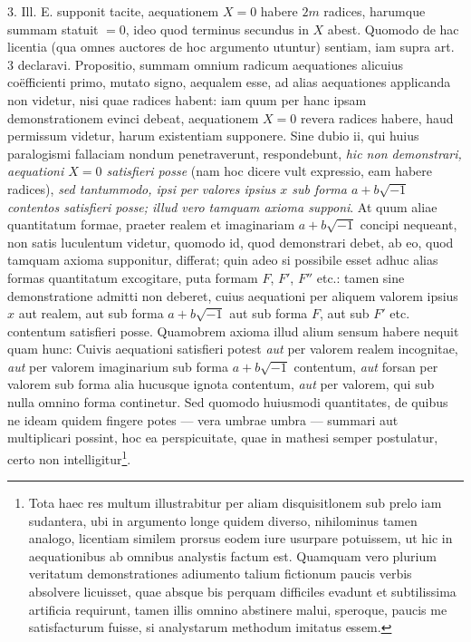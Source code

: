 \documentclass[twoside,12pt, showframe]{memoir}
\begin{document}
3. Ill. \textsc{E.} supponit tacite, aequationem \(X=0\) habere \(2m\) radices, harumque summam statuit \(= 0\), ideo quod terminus secundus in \(X\) abest. Quomodo de hac licentia (qua omnes auctores de hoc argumento utuntur) sentiam, iam supra art. 3 declaravi. Propositio, summam omnium radicum aequationes alicuius co\"efficienti primo, mutato signo, aequalem esse, ad alias aequationes applicanda non videtur, nisi quae radices habent: iam quum per hanc ipsam demonstrationem evinci debeat, aequationem \(X = 0\) revera radices habere, haud permissum videtur, harum existentiam supponere. Sine dubio ii, qui huius paralogismi fallaciam nondum penetraverunt, respondebunt, \textit{hic non demonstrari, aequationi \(X= 0\) satisfieri posse} (nam hoc dicere vult expressio, eam habere radices), \textit{sed tantummodo, ipsi per valores ipsius \(x\) sub forma \(a + b \surd{-1}\) contentos satisfieri posse; illud vero tamquam axioma supponi}. At quum aliae quantitatum formae, praeter realem et imaginariam \(a + b \surd{-1}\) concipi nequeant, non satis luculentum videtur, quomodo id, quod demonstrari debet, ab eo, quod tamquam axioma supponitur, differat; quin adeo si possibile esset adhuc alias formas quantitatum excogitare, puta formam \(F\), \(F'\), \(F''\) etc{.}: tamen sine demonstratione admitti non deberet, cuius aequationi per aliquem valorem ipsius \(x\) aut realem, aut sub forma \(a + b \surd{-1}\) aut sub forma \(F\), aut sub \(F'\) etc{.} contentum satisfieri posse. Quamobrem axioma illud alium sensum habere nequit quam hunc: Cuivis aequationi satisfieri potest \textit{aut} per valorem realem incognitae, \textit{aut} per valorem imaginarium sub forma \(a + b \surd{-1}\) contentum, \textit{aut} forsan per valorem sub forma alia hucusque ignota contentum, \textit{aut} per valorem, qui sub nulla omnino forma continetur. Sed quomodo huiusmodi quantitates, de quibus ne ideam quidem fingere potes — vera umbrae umbra — summari aut multiplicari possint, hoc ea perspicuitate, quae in mathesi semper postulatur, certo non intelligitur\footnote{Tota haec res multum illustrabitur per aliam disquisitlonem sub prelo iam sudantera, ubi in argumento longe quidem diverso, nihilominus tamen analogo, licentiam similem prorsus eodem iure usurpare potuissem, ut hic in aequationibus ab omnibus analystis factum est. Quamquam vero plurium veritatum demonstrationes adiumento talium fictionum paucis verbis absolvere licuisset, quae absque bis perquam difficiles evadunt et subtilissima artificia requirunt, tamen illis omnino abstinere malui, speroque, paucis me satisfacturum fuisse, si analystarum methodum imitatus essem.}.
\end{document}
